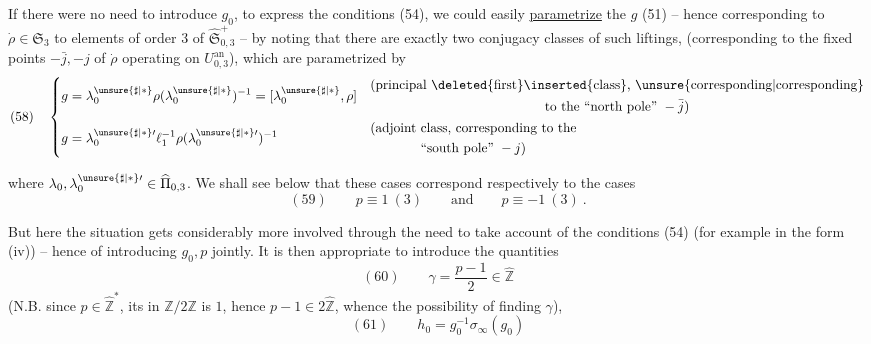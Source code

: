 If there were no need to introduce $g_0$, to express the conditions (54), we could easily \uline{parametrize} the $g$  (51) -- hence corresponding to  $\dot\rho\in\mathfrak S_3$ to elements of order $3$ of $\widehat{\mathfrak S}_{0,3}^{+}$ -- by noting that there are exactly two conjugacy classes of such liftings, (corresponding to the fixed points $-\bar j,-j$ of $\dot\rho$ operating on $U_{0,3}^{\mathrm{an}}$), which are parametrized by
\[
(58)\quad
\left\{\begin{aligned}
g&=\lambda_0^{\unsure{\sharp|\ast}}\rho(\lambda_0^{\unsure{\sharp|\ast}})^{-1}
=[\lambda_0^{\unsure{\sharp|\ast}},\rho]
&&\begin{gathered}\text{(principal \deleted{first}\inserted{class}, \unsure{corresponding|corresponding}}\\
\text{to the ``north pole'' }-\bar j)\end{gathered}\\
g&=\lambda_0^{\unsure{\sharp|\ast}\prime}\ell_1^{-1}\rho(\lambda_0^{\unsure{\sharp|\ast}\prime})^{-1}
&&\begin{gathered}\text{(adjoint class, corresponding to the}\\
\text{``south pole'' }-j)\end{gathered}
\end{aligned}\right.
\]


where $\lambda_0,\lambda_0^{\unsure{\sharp|\ast}\prime}\in\widehat{\Pi}_{0,3}$. We shall see below that these cases correspond respectively to the cases
\[
(59)\qquad p\equiv1\ (3)\qquad\text{and}\qquad p\equiv-1\ (3)\ .
\]


But here the situation gets considerably more involved through the need to take account of the  conditions (54) (for example in the form (iv)) -- hence  of introducing $g_0,p$ jointly. It is then appropriate to introduce the quantities
\[
(60)\qquad \gamma=\frac{p-1}{2}\in\widehat{\mathbb Z}
\]
(N.B. since $p\in\widehat{\mathbb Z}^{\ast}$, its  in $\mathbb Z/2\mathbb Z$ is $1$, hence $p-1\in2\widehat{\mathbb Z}$, whence the possibility of finding $\gamma$),
\[
(61)\qquad h_0=g_0^{-1}\sigma_\infty(g_0)
\]


